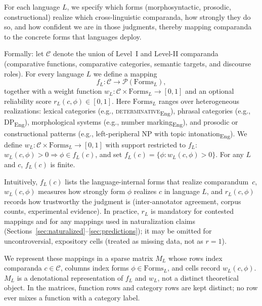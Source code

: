 \documentclass[12pt]{article}
\begin{document}
For each language $L$, we specify which forms (morphosyntactic, prosodic, constructional) realize which cross-linguistic comparanda, how strongly they do so, and how confident we are in those judgments, thereby mapping comparanda to the concrete forms that languages deploy. 

Formally: let $\mathcal{C}$ denote the union of Level~I and Level-II comparanda  (comparative functions, comparative categories, semantic targets, and discourse roles). For every language $L$ we define a mapping
\[
  f_L : \mathcal{C} \rightarrow \mathcal{P}(\mathrm{Forms}_L),
\]
together with a weight function $w_L : \mathcal{C} \times \mathrm{Forms}_L \to [0,1]$ and an optional reliability score $r_L(c, \phi) \in [0,1]$. Here $\mathrm{Forms}_L$ ranges over heterogeneous realizations: lexical categories (e.g., \textsc{determinative}\textsubscript{Eng}), phrasal categories (e.g., \textsc{DP}\textsubscript{Eng}), morphological systems (e.g., number marking\textsubscript{Eng}), and prosodic or constructional patterns (e.g., left-peripheral NP with topic intonation\textsubscript{Eng}). We define $w_L : \mathcal{C} \times \mathrm{Forms}_L \to [0,1]$ with support restricted to $f_L$: $w_L(c,\phi) > 0 \Rightarrow \phi \in f_L(c)$, and set $f_L(c) = \{\phi : w_L(c,\phi) > 0\}$. For any $L$ and $c$, $f_L(c)$ is finite.

Intuitively, $f_L(c)$ lists the language-internal forms that realize comparandum~$c$, $w_L(c, \phi)$ measures how strongly form $\phi$ realizes $c$ in language $L$, and $r_L(c, \phi)$ records how trustworthy the judgment is (inter-annotator agreement, corpus counts, experimental evidence). In practice, $r_L$ is mandatory for contested mappings and for any mappings used in naturalization claims (Sections~\ref{sec:naturalized}--\ref{sec:predictions}); it may be omitted for uncontroversial, expository cells (treated as missing data, not as $r=1$).

We represent these mappings in a sparse matrix $M_L$ whose rows index comparanda $c \in \mathcal{C}$, columns index forms $\phi \in \mathrm{Forms}_L$, and cells record $w_L(c,\phi)$. $M_L$ is a denotational representation of $f_L$ and $w_L$, not a distinct theoretical object. In the matrices, function rows and category rows are kept distinct; no row ever mixes a function with a category label.
\end{document}

